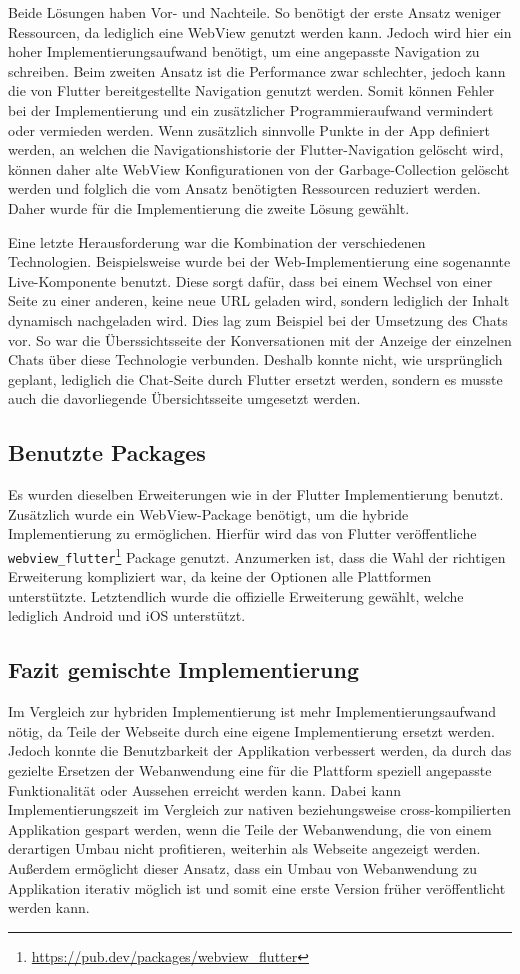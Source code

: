 Beide Lösungen haben Vor- und Nachteile. So benötigt der erste Ansatz weniger Ressourcen, da lediglich eine WebView genutzt werden kann. Jedoch wird hier ein hoher Implementierungsaufwand benötigt, um eine angepasste Navigation zu schreiben. 
Beim zweiten Ansatz ist die Performance zwar schlechter, jedoch kann die von Flutter bereitgestellte Navigation genutzt werden. Somit können Fehler bei der Implementierung und ein zusätzlicher Programmieraufwand vermindert oder vermieden werden.
Wenn zusätzlich sinnvolle Punkte in der App definiert werden, an welchen die Navigationshistorie der Flutter-Navigation gelöscht wird, können daher alte WebView Konfigurationen von der Garbage-Collection gelöscht werden und folglich die vom Ansatz benötigten Ressourcen reduziert werden. Daher wurde für die Implementierung die zweite Lösung gewählt. 

Eine letzte Herausforderung war die Kombination der verschiedenen Technologien. Beispielsweise wurde bei der Web-Implementierung eine sogenannte Live-Komponente benutzt. Diese sorgt dafür, dass bei einem Wechsel von einer Seite zu einer anderen, keine neue URL geladen wird, sondern lediglich der Inhalt dynamisch nachgeladen wird. Dies lag zum Beispiel bei der Umsetzung des Chats vor. So war die Überssichtsseite der Konversationen mit der Anzeige der einzelnen Chats über diese Technologie verbunden. Deshalb konnte nicht, wie ursprünglich geplant, lediglich die Chat-Seite durch Flutter ersetzt werden, sondern es musste auch die davorliegende Übersichtsseite umgesetzt werden.

\subsection{Benutzte Packages}
Es wurden dieselben Erweiterungen wie in der Flutter Implementierung benutzt. Zusätzlich wurde ein WebView-Package benötigt, um die hybride Implementierung zu ermöglichen. Hierfür wird das von Flutter veröffentliche \verb|webview_flutter|\footnote{\url{https://pub.dev/packages/webview\_flutter}} Package genutzt. Anzumerken ist, dass die Wahl der richtigen Erweiterung kompliziert war, da keine der Optionen alle Plattformen unterstützte. Letztendlich wurde die offizielle Erweiterung gewählt, welche lediglich Android und iOS unterstützt.

\subsection{Fazit gemischte Implementierung}
Im Vergleich zur hybriden Implementierung ist mehr Implementierungsaufwand nötig, da Teile der Webseite durch eine eigene Implementierung ersetzt werden. Jedoch konnte die Benutzbarkeit der Applikation verbessert werden, da durch das gezielte Ersetzen der Webanwendung eine für die Plattform speziell angepasste Funktionalität oder Aussehen erreicht werden kann. Dabei kann Implementierungszeit im Vergleich zur nativen beziehungsweise cross-kompilierten Applikation gespart werden, wenn die Teile der Webanwendung, die von einem derartigen Umbau nicht profitieren, weiterhin als Webseite angezeigt werden.
Außerdem ermöglicht dieser Ansatz, dass ein Umbau von Webanwendung zu Applikation iterativ möglich ist und somit eine erste Version früher veröffentlicht werden kann.


